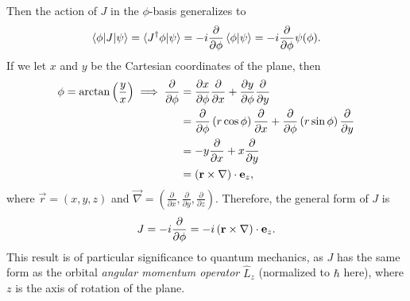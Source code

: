 
Then the action of $J$ in the $\phi$-basis generalizes to
\begin{align*}
    \braket{\phi|J|\psi} = \braket{J^\dagger \phi|\psi} = -i\frac{\partial}{\partial\phi}\braket{\phi|\psi} = -i\frac{\partial}{\partial\phi}\psi(\phi).
\end{align*}
If we let $x$ and $y$ be the Cartesian coordinates of the plane, then
\begin{align*}
    \phi = \arctan\left(\frac{y}{x}\right) \implies \frac{\partial}{\partial\phi} 
        &= \frac{\partial x}{\partial \phi}\frac{\partial}{\partial x} + \frac{\partial y}{\partial \phi}\frac{\partial}{\partial y} \\
        &= \frac{\partial}{\partial\phi}\left( r\cos\phi \right)\frac{\partial}{\partial x} + \frac{\partial}{\partial\phi}\left( r\sin\phi \right)\frac{\partial}{\partial y} \\
        &= -y\frac{\partial}{\partial x} + x\frac{\partial}{\partial y} \\
        &= (\mathbf{r}\times\mathbf{\nabla})\cdot\mathbf{e}_z,
\end{align*}
where $\vec{r} = (x,y,z)$ and $\vec{\nabla} = \left(\frac{\partial}{\partial x},\frac{\partial}{\partial y},\frac{\partial}{\partial z}\right)$. Therefore, the general form of $J$ is
\begin{align}\label{eq:SO2_J}
    J = -i \frac{\partial}{\partial\phi} = -i \left( \mathbf{r}\times\mathbf{\nabla} \right)\cdot\mathbf{e}_z.
\end{align}
This result is of particular significance to quantum mechanics, as $J$ has the same form as the orbital \textit{angular momentum operator} $\hat{L}_z$ (normalized to $\hbar$ here), where $z$ is the axis of rotation of the plane\cite{Hall2013,Griffiths2018}.


